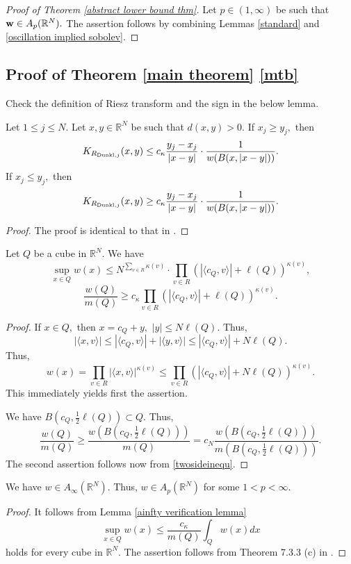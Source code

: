 \documentclass{amsart}
\begin{document}
\begin{proof}[Proof of Theorem \ref{abstract lower bound thm}] Let $p\in(1,\infty)$ be such that ${\bf w}\in A_p(\mathbb{R}^N).$ The assertion follows by combining Lemmas \ref{standard} and \ref{oscillation implied sobolev}.
\end{proof}

\subsection{Proof of Theorem \ref{main theorem} \eqref{mtb}}
{\color{red} Check the definition of Riesz transform and the sign in the below lemma.}
\begin{lemma}\label{nondegenerate}
Let $1\leq j\leq N.$ Let $x,y\in\mathbb{R}^N$ be such that $d(x,y)>0.$ If $x_j\geq y_j,$ then
$$K_{R_{{\rm Dunkl},j}}(x,y)\leq c_{\kappa}\frac{y_j-x_j}{|x-y|}\cdot\frac1{w(B(x,|x-y|))}.$$
If $x_j\leq y_j,$ then
$$K_{R_{{\rm Dunkl},j}}(x,y)\geq c_{\kappa}\frac{y_j-x_j}{|x-y|}\cdot\frac1{w(B(x,|x-y|))}.$$
\end{lemma}
\begin{proof} The proof is identical to that in \cite[Theorem 1.2]{MR4733961}.
\end{proof}

\begin{lemma}\label{ainfty verification lemma} Let $Q$ be a cube in $\mathbb{R}^N.$ We have
$$\sup_{x\in Q}w(x)\leq N^{\sum_{v\in R}\kappa(v)}\cdot\prod_{v\in R}(|\langle c_Q,v\rangle|+\ell(Q))^{\kappa(v)},$$
$$\frac{w(Q)}{m(Q)}\geq c_{\kappa}\prod_{v\in R}(|\langle c_Q,v\rangle|+\ell(Q))^{\kappa(v)}.$$
\end{lemma}
\begin{proof} If $x\in Q,$ then $x=c_Q+y,$ $|y|\leq N\ell(Q).$ Thus,
$$|\langle x,v\rangle|\leq|\langle c_Q,v\rangle|+|\langle y,v\rangle|\leq |\langle c_Q,v\rangle|+N\ell(Q).$$
Thus,
$$w(x)=\prod_{v\in R}|\langle x,v\rangle|^{\kappa(v)}\leq\prod_{v\in R}(|\langle c_Q,v\rangle|+N\ell(Q))^{\kappa(v)}.$$
This immediately yields first the assertion.

We have $B(c_Q,\frac12\ell(Q))\subset Q.$ Thus,
$$\frac{w(Q)}{m(Q)}\geq\frac{w(B(c_Q,\frac12\ell(Q)))}{m(Q)}=c_N\frac{w(B(c_Q,\frac12\ell(Q)))}{m(B(c_Q,\frac12\ell(Q)))}.$$
The second assertion follows now from \eqref{twosideinequ}.
\end{proof}


\begin{lemma}\label{ainfty w lemma} We have $w\in A_{\infty}(\mathbb{R}^N).$ Thus, $w\in A_p(\mathbb{R}^N)$ for some $1<p<\infty.$
\end{lemma}
\begin{proof} It follows from Lemma \ref{ainfty verification lemma}
$$\sup_{x\in Q}w(x)\leq \frac{c_{\kappa}}{m(Q)}\int_Qw(x)dx$$
holds for every cube in $\mathbb{R}^N.$ The assertion follows from Theorem 7.3.3 (c) in \cite{Grafakos-1}.
\end{proof}
\end{document}
